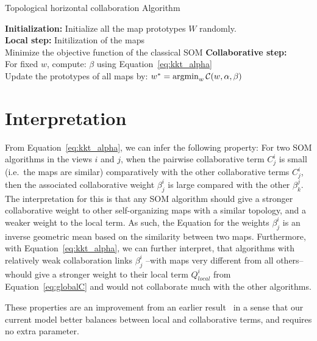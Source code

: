 \begin{algorithm}[!h]
\label{alg:algoGen}
\SetAlgoLined{}
	\vspace{0.05cm}
	\caption{Topological horizontal collaboration Algorithm}
	\vspace{0.05cm}
	\textbf{Initialization:} Initialize all the map prototypes $W$ randomly. \\
	\textbf{Local step:} Initilization of the maps\\
	 {
		Minimize the objective function of the classical SOM
	} 
	\textbf{Collaborative step:}\\
	 {
		For fixed $w$, compute:
		$\beta$ using Equation~\eqref{eq:kkt_alpha} \\	 
		Update the prototypes of all maps by: 
		$ 
		w^{*} =  \operatornamewithlimits{argmin}_{w}\mathcal{C}(w,\alpha,\beta) 
		$
	}	 
\end{algorithm}

\section{Interpretation}
\label{sec:interpretation}

From Equation~\eqref{eq:kkt_alpha}, we can infer the following property: For two SOM algorithms in the views $i$ and $j$, when the pairwise collaborative term $C_j^i$ is small (i.e.\ the maps are similar) comparatively with the other collaborative terms $C_j^i$, then the associated collaborative weight $\beta_j^i$ is large compared with the other $\beta_k^j$. The interpretation for this is that any SOM algorithm should give a stronger collaborative weight to other self-organizing maps with a similar topology, and a weaker weight to the local term. As such, the Equation for the weights $\beta_j^i$ is an inverse geometric mean based on the similarity between two maps. 
Furthermore, with Equation~\eqref{eq:kkt_alpha}, we can further interpret, that algorithms with relatively weak collaboration links $\beta_j^i$ --with maps very different from all others-- whould give a stronger weight to their local term $Q^i_{local}$ from Equation~\eqref{eq:globalC} and would not collaborate much with the other algorithms. 

These properties are an improvement from an earlier result~\cite{Sublime2017} in a sense that our current model better balances between local and collaborative terms, and requires no extra parameter.

